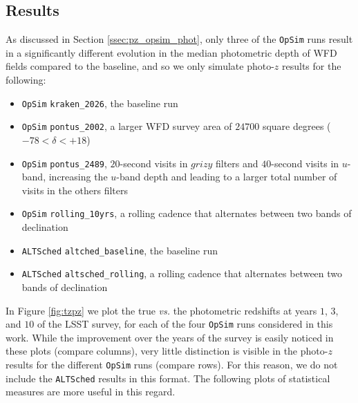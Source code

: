 \subsection{Results}\label{ssec:pz_results}

As discussed in Section \ref{ssec:pz_opsim_phot}, only three of the {\tt OpSim} runs result in a significantly different evolution in the median photometric depth of WFD fields compared to the baseline, and so we only simulate photo-$z$ results for the following: 

\begin{itemize}
\item {\tt OpSim} {\tt kraken\_2026}, the baseline run
\item {\tt OpSim} {\tt pontus\_2002}, a larger WFD survey area of $24700$ square degrees ($-78 < \delta < +18$)
\item {\tt OpSim} {\tt pontus\_2489}, $20$-second visits in $grizy$ filters and $40$-second visits in $u$-band, increasing the $u$-band depth and leading to a larger total number of visits in the others filters
\item {\tt OpSim} {\tt rolling_10yrs}, a rolling cadence that alternates between two bands of declination
\item {\tt ALTSched} {\tt altched\_baseline}, the baseline run
\item {\tt ALTSched} {\tt altsched\_rolling}, a rolling cadence that alternates between two bands of declination
\end{itemize}

In Figure \ref{fig:tzpz} we plot the true {\it vs.} the photometric redshifts at years $1$, $3$, and $10$ of the LSST survey, for each of the four {\tt OpSim} runs considered in this work. While the improvement over the years of the survey is easily noticed in these plots (compare columns), very little distinction is visible in the photo-$z$ results for the different {\tt OpSim} runs (compare rows). For this reason, we do not include the {\tt ALTSched} results in this format. The following plots of statistical measures are more useful in this regard.

